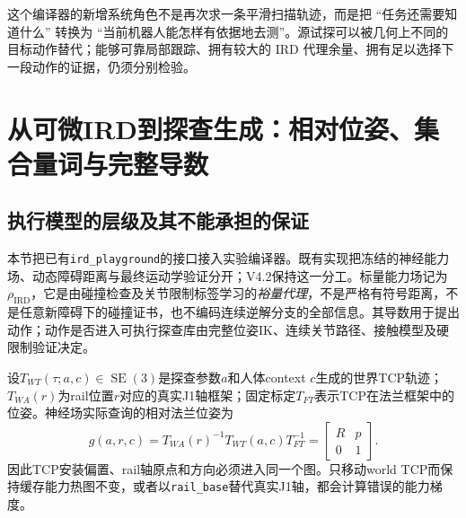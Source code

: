 \documentclass[11pt,a4paper]{article}
\numberwithin{equation}{section}
\theoremstyle{definition}
\DeclareMathOperator{\SE}{SE}
\begin{document}
这个编译器的新增系统角色不是再次求一条平滑扫描轨迹，而是把 ``任务还需要知道什么'' 转换为 ``当前机器人能怎样有依据地去测''。源试探可以被几何上不同的目标动作替代；能够可靠局部跟踪、拥有较大的 IRD 代理余量、拥有足以选择下一段动作的证据，仍须分别检验。


\section{从可微IRD到探查生成：相对位姿、集合量词与完整导数}
\label{ird:sec}

\subsection{执行模型的层级及其不能承担的保证}
本节把已有\texttt{ird\_playground}的接口接入实验编译器。既有实现把冻结的神经能力场、动态障碍距离与最终运动学验证分开；V4.2保持这一分工。标量能力场记为$\rho_{\mathrm{IRD}}$，它是由碰撞检查及关节限制标签学习的\emph{裕量代理}，不是严格有符号距离，不是任意新障碍下的碰撞证书，也不编码连续逆解分支的全部信息。其导数用于提出动作；动作是否进入可执行探查库由完整位姿IK、连续关节路径、接触模型及硬限制验证决定。

设$T_{WT}(\tau;a,c)\in\SE(3)$是探查参数$a$和人体context $c$生成的世界TCP轨迹；$T_{WA}(r)$为rail位置$r$对应的真实J1轴框架；固定标定$T_{FT}$表示TCP在法兰框架中的位姿。神经场实际查询的相对法兰位姿为
\begin{equation}
 g(a,r,c)=T_{WA}(r)^{-1}T_{WT}(a,c)T_{FT}^{-1}
 =\begin{bmatrix}R&p\\0&1\end{bmatrix}.
 \label{ird:relative}
\end{equation}
因此TCP安装偏置、rail轴原点和方向必须进入同一个图。只移动world TCP而保持缓存能力热图不变，或者以\texttt{rail\_base}替代真实J1轴，都会计算错误的能力梯度。
\end{document}
